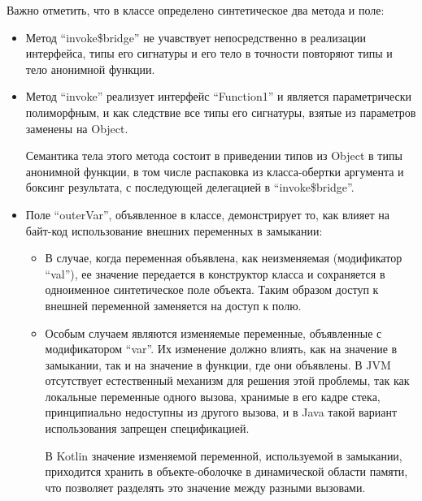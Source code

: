 Важно отметить, что в классе определено синтетическое два метода и поле:
\begin{itemize}
    \item Метод ``invoke\$bridge'' не учавствует непосредственно в реализации интерфейса, типы его
    сигнатуры и его тело в точности повторяют типы и тело анонимной функции.

    \item Метод ``invoke'' реализует интерфейс ``Function1'' и является параметрически полиморфным,
    и как следствие все типы его сигнатуры, взятые из параметров заменены на Object.

    Семантика тела этого метода состоит в приведении типов из Object в типы анонимной функции,
    в том числе распаковка из класса-обертки аргумента и боксинг результата, с последующей
    делегацией в ``invoke\$bridge''.

    \item Поле ``outerVar'', объявленное в классе, демонстрирует то, как влияет на байт-код
    использование внешних переменных в замыкании:
    \begin{itemize}
        \item В случае, когда переменная объявлена, как неизменяемая (модификатор ``val''), ее
        значение передается в конструктор класса и сохраняется в одноименное синтетическое поле
        объекта.
        Таким образом доступ к внешней переменной заменяется на доступ к полю.
        \item Особым случаем являются изменяемые переменные, объявленные с модификатором ``var''.
        Их изменение должно влиять, как на значение в замыкании, так и на значение в функции, где
        они объявлены. В JVM отсутствует естественный механизм для решения этой проблемы, так как
        локальные переменные одного вызова, хранимые в его кадре стека, принципиально недоступны
        из другого вызова, и в Java такой вариант использования запрещен спецификацией.

        В Kotlin значение изменяемой переменной, используемой в замыкании, приходится хранить
        в объекте-оболочке в динамической области памяти, что позволяет разделять это значение
        между разными вызовами.
    \end{itemize}
\end{itemize}
